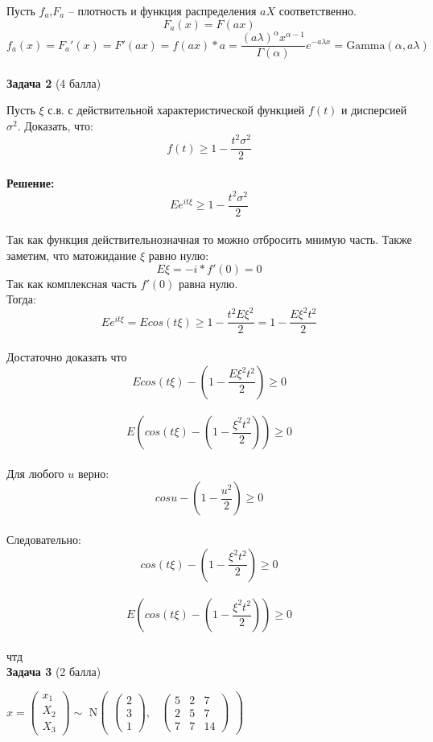 \documentclass{article}
\newcommand\Gammad{\text{Gamma}}
\begin{document}
Пусть $f_a$,$F_a$ -- плотность и функция распределения $aX$ соответственно.\\
$$F_a(x) = F(ax)$$
$$f_a(x) = F_a'(x) = F'(ax) = f(ax)*a = \frac{ (a\lambda)^\alpha x^{\alpha - 1} }{ \Gamma(\alpha) } e^{-a\lambda x}  = \Gammad(\alpha, a\lambda)$$\\

\textbf{Задача 2} (4 балла)

Пусть $\xi$ с.в. с действительной характеристической функцией $f(t)$ и дисперсией $\sigma^2$. Доказать, что:
$$f(t) \geq 1 - \frac{t^2\sigma^2}{2}$$\\

\textbf{Решение:}\\
$$Ee^{it\xi} \geq 1 - \frac{t^2\sigma^2}{2}$$\\
Так как функция действительнозначная то можно отбросить мнимую часть. Также заметим, что матожидание $\xi$ равно нулю:\\
$$E\xi = -i*f'(0) = 0$$
Так как комплексная часть $f'(0)$ равна нулю.\\

Тогда:\\
$$Ee^{it\xi} = Ecos(t\xi) \geq 1 - \frac{t^2 E\xi ^2}{2} = 1 - \frac{E\xi ^2t^2}{2}$$\\
Достаточно доказать что
$$Ecos(t\xi) -(1 - \frac{E\xi ^2t^2}{2}) \geq 0$$\\
$$E(cos(t\xi) -(1 - \frac{\xi ^2t^2}{2})) \geq 0$$\\
Для любого $u$ верно:
$$cosu -(1 - \frac{u^2}{2}) \geq 0$$\\
Следовательно:
$$cos(t\xi) -(1 - \frac{\xi ^2t^2}{2}) \geq 0$$\\
$$E(cos(t\xi) -(1 - \frac{\xi ^2t^2}{2})) \geq 0$$\\
чтд\\

\textbf{Задача 3} (2 балла)
\begin{center}
$x = \begin{pmatrix}
  x_1 \\ X_2 \\ X_3 
\end{pmatrix} \sim$
$\mathrm{N} \begin{pmatrix}
\begin{pmatrix}
2 \\ 3 \\ 1
\end{pmatrix}, &
\begin{pmatrix}
5 & 2 & 7 \\ 2 & 5 & 7 \\ 7 & 7 & 14
\end{pmatrix}    
\end{pmatrix}$    
\end{center}
\end{document}
